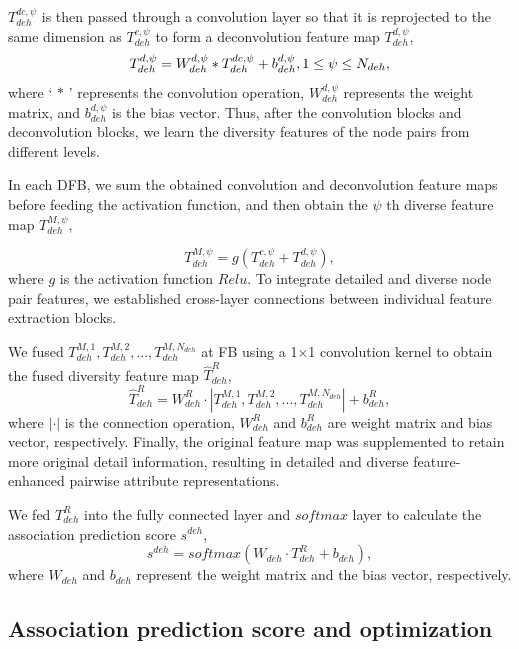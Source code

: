 \documentclass[journal,twoside,web]{ieeecolor}
\begin{document}
$T_{deh}^{dc,\psi }$ is then passed through a convolution layer so that it is reprojected to the same dimension as $T_{deh}^{c,\psi }$ to form a deconvolution feature map $T_{deh}^{d,\psi }$,
\begin{equation}
T_{deh}^{d,\psi } = W_{deh}^{d,\psi } * {\rm{ }}T_{deh}^{dc,\psi } + b_{deh}^{d,\psi }{\rm{ ,1}} \le \psi  \le {N_{deh}},
\end{equation}
where ` $ * $ ' represents the convolution operation, $W_{deh}^{d,\psi }$ represents the weight matrix, and $b_{deh}^{d,\psi }$ is the bias vector. 
Thus, after the convolution blocks and deconvolution blocks, we learn the diversity features of the node pairs from different levels. 

In each DFB, we sum the obtained convolution and deconvolution feature maps before feeding the activation function, and then obtain the $\psi $ th diverse feature map $T_{deh}^{M,\psi }$,

\begin{equation}
T_{deh}^{M,\psi } = g\left( {T_{deh}^{c,\psi } + T_{deh}^{d,\psi }} \right),
\end{equation}
where $g$ is the activation function $Relu$. To integrate detailed and diverse node pair features, we established cross-layer connections between individual feature extraction blocks. 

We fused $T_{deh}^{M,1},T_{deh}^{M,2},...,T_{deh}^{M,{N_{deh}}}$ at FB using a 1×1 convolution kernel to obtain the fused diversity feature map $\hat T_{deh}^R$,
\begin{equation}
\hat T_{deh}^R = W_{deh}^R \cdot \left| {T_{deh}^{M,1},T_{deh}^{M,2},...,T_{deh}^{M,{N_{deh}}}} \right| + b_{deh}^R,
\end{equation}
where $\left|  \cdot  \right|$ is the connection operation, $W_{deh}^R$ and $b_{deh}^R$ are weight matrix and bias vector, respectively. Finally, the original feature map was supplemented to retain more original detail information, resulting in detailed and diverse feature-enhanced pairwise attribute representations.

We fed $T_{deh}^R$ into the fully connected layer and $softmax$ layer to calculate the association prediction score ${s^{deh}}$,
\begin{equation}
{s^{deh}} = softmax\left( {{W_{deh}} \cdot T_{deh}^R + {b_{deh}}} \right),\end{equation}
where ${W_{deh}}$ and ${b_{deh}}$ represent the weight matrix and the bias vector, respectively.
\subsection{Association prediction score and optimization}
\end{document}
